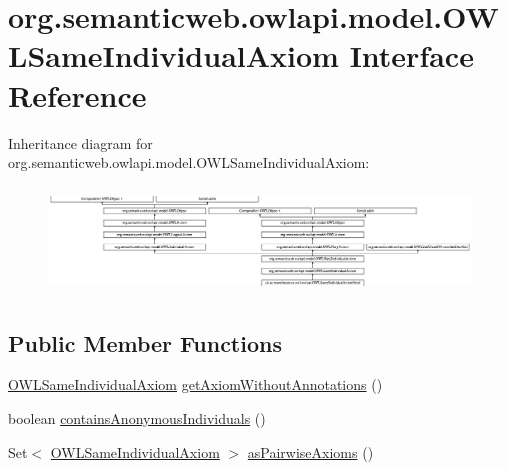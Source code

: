 \hypertarget{interfaceorg_1_1semanticweb_1_1owlapi_1_1model_1_1_o_w_l_same_individual_axiom}{\section{org.\-semanticweb.\-owlapi.\-model.\-O\-W\-L\-Same\-Individual\-Axiom Interface Reference}
\label{interfaceorg_1_1semanticweb_1_1owlapi_1_1model_1_1_o_w_l_same_individual_axiom}
}
Inheritance diagram for org.\-semanticweb.\-owlapi.\-model.\-O\-W\-L\-Same\-Individual\-Axiom\-:\begin{figure}[H]
\begin{center}
\leavevmode
\includegraphics[height=2.857143cm]{interfaceorg_1_1semanticweb_1_1owlapi_1_1model_1_1_o_w_l_same_individual_axiom}
\end{center}
\end{figure}
\subsection*{Public Member Functions}
\begin{DoxyCompactItemize}
\item 
\hyperlink{interfaceorg_1_1semanticweb_1_1owlapi_1_1model_1_1_o_w_l_same_individual_axiom}{O\-W\-L\-Same\-Individual\-Axiom} \hyperlink{interfaceorg_1_1semanticweb_1_1owlapi_1_1model_1_1_o_w_l_same_individual_axiom_a5342a52c118eacfbdd6abac5d4fbb511}{get\-Axiom\-Without\-Annotations} ()
\item 
boolean \hyperlink{interfaceorg_1_1semanticweb_1_1owlapi_1_1model_1_1_o_w_l_same_individual_axiom_ab8587c188b02edd8dc40b54c419c3637}{contains\-Anonymous\-Individuals} ()
\item 
Set$<$ \hyperlink{interfaceorg_1_1semanticweb_1_1owlapi_1_1model_1_1_o_w_l_same_individual_axiom}{O\-W\-L\-Same\-Individual\-Axiom} $>$ \hyperlink{interfaceorg_1_1semanticweb_1_1owlapi_1_1model_1_1_o_w_l_same_individual_axiom_a94d61d9207f591efcf02df75357a88ef}{as\-Pairwise\-Axioms} ()
\end{DoxyCompactItemize}



